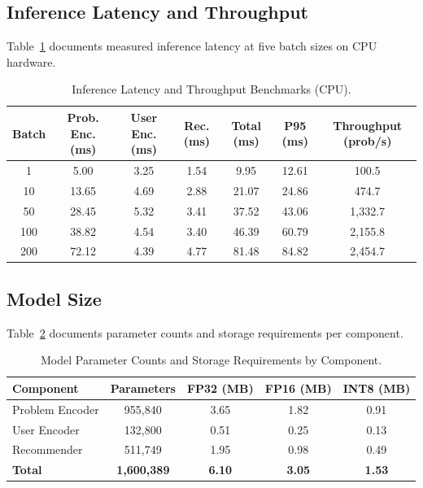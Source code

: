 \documentclass[12pt]{article}
\begin{document}
\subsection{Inference Latency and Throughput}

Table~\ref{tab:latency} documents measured inference latency at five batch sizes on CPU hardware.

\begin{table}[H]
\centering
\caption{Inference Latency and Throughput Benchmarks (CPU).}
\label{tab:latency}
\begin{tabular}{ccccccc}
\toprule
\textbf{Batch} & \textbf{Prob. Enc. (ms)} & \textbf{User Enc. (ms)} & \textbf{Rec. (ms)} & \textbf{Total (ms)} & \textbf{P95 (ms)} & \textbf{Throughput (prob/s)} \\
\midrule
1   & 5.00  & 3.25 & 1.54 & 9.95  & 12.61 & 100.5   \\
10  & 13.65 & 4.69 & 2.88 & 21.07 & 24.86 & 474.7   \\
50  & 28.45 & 5.32 & 3.41 & 37.52 & 43.06 & 1{,}332.7 \\
100 & 38.82 & 4.54 & 3.40 & 46.39 & 60.79 & 2{,}155.8 \\
200 & 72.12 & 4.39 & 4.77 & 81.48 & 84.82 & 2{,}454.7 \\
\bottomrule
\end{tabular}
\end{table}

\subsection{Model Size}

Table~\ref{tab:modelsize} documents parameter counts and storage requirements per component.

\begin{table}[H]
\centering
\caption{Model Parameter Counts and Storage Requirements by Component.}
\label{tab:modelsize}
\begin{tabular}{lcccc}
\toprule
\textbf{Component} & \textbf{Parameters} & \textbf{FP32 (MB)} & \textbf{FP16 (MB)} & \textbf{INT8 (MB)} \\
\midrule
Problem Encoder & 955{,}840 & 3.65 & 1.82 & 0.91 \\
User Encoder    & 132{,}800 & 0.51 & 0.25 & 0.13 \\
Recommender     & 511{,}749 & 1.95 & 0.98 & 0.49 \\
\midrule
\textbf{Total}  & \textbf{1{,}600{,}389} & \textbf{6.10} & \textbf{3.05} & \textbf{1.53} \\
\bottomrule
\end{tabular}
\end{table}
\end{document}
